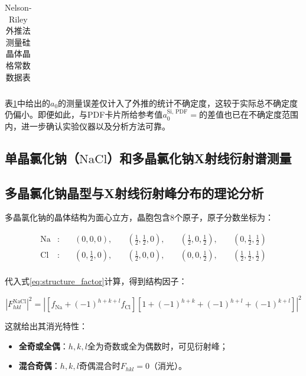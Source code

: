 \documentclass{thuemp}
\begin{document}
\begin{table}[H]
    \centering
    \captionnamefont{\wuhao\bf\heiti}
    \captiontitlefont{\wuhao\bf\heiti}
    \caption{Nelson-Riley外推法测量硅晶体晶格常数数据表}
    \label{tab:si_xrd_extrapol}
    \liuhao
    \begin{tabular}{ccccc}
        \toprule
        \midrule
        \bottomrule
    \end{tabular}
\end{table}

表\ref{tab:si_xrd_extrapol}中给出的$a_0$的测量误差仅计入了外推的统计不确定度，这较于实际总不确定度仍偏小。即便如此，与PDF卡片所给参考值$a_0^{\text{Si, PDF}} = $的差值也已在不确定度范围内，进一步确认实验仪器以及分析方法可靠。

\subsection{单晶氯化钠（$\text{NaCl}$）和多晶氯化钠X射线衍射谱测量}

\subsection{多晶氯化钠晶型与X射线衍射峰分布的理论分析}

多晶氯化钠的晶体结构为面心立方，晶胞包含8个原子，原子分数坐标为：

\begin{align*}
\text{Na} &:
\quad &\left(0,0,0\right),
\quad &\left(\frac{1}{2},\frac{1}{2},0\right),
\quad &\left(\frac{1}{2},0,\frac{1}{2}\right),
\quad &\left(0,\frac{1}{2},\frac{1}{2}\right)\\
\text{Cl} &:
\quad &\left(0,\frac{1}{2},0\right),
\quad &\left(\frac{1}{2},0,0\right),
\quad &\left(0,0,\frac{1}{2}\right),
\quad &\left(\frac{1}{2},\frac{1}{2}, \frac{1}{2}\right) \\
\end{align*}

代入式\ref{eq:structure_factor}计算，得到结构因子：

\begin{equation}
    |F_{hkl}^{\text{NaCl}}|^2 = |\left[f_{\text{Na}}+(-1)^{h+k+l}f_\text{Cl}\right]\left[ 1 + (-1)^{h+k} + (-1)^{h+l} + (-1)^{k+l}\right]|^2
\end{equation}

这就给出其消光特性：

\begin{itemize}
    \item \textbf{全奇或全偶}：$h,k,l$全为奇数或全为偶数时，可见衍射峰；
    \item \textbf{混合奇偶}：$h,k,l$奇偶混合时$F_{hkl}=0$（消光）。
\end{itemize}
\end{document}
